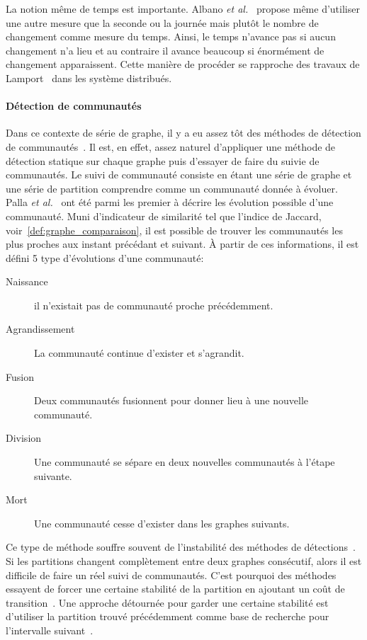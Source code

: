 La notion même de temps est importante.
Albano \emph{et al.}~\cite{Albano2014} propose même d'utiliser une autre mesure que la seconde ou la journée mais plutôt le nombre de changement comme mesure du temps.
Ainsi, le temps n'avance pas si aucun changement n'a lieu et au contraire il avance beaucoup si énormément de changement apparaissent.
Cette manière de procéder se rapproche des travaux de Lamport~\cite{Lamport1978} dans les système distribués.

\paragraph{Détection de communautés}
Dans ce contexte de série de graphe, il y a eu assez tôt des méthodes de détection de communautés~\cite{Hopcroft2004,Sun2007,Lin2008,Asur2009}.
Il est, en effet, assez naturel d'appliquer une méthode de détection statique sur chaque graphe puis d'essayer de faire du suivie de communautés.
Le suivi de communauté consiste en étant une série de graphe et une série de partition comprendre comme un communauté donnée à évoluer.
Palla \emph{et al.}~\cite{Palla2007} ont été parmi les premier à décrire les évolution possible d'une communauté.
Muni d'indicateur de similarité tel que l'indice de Jaccard, voir~\ref{def:graphe_comparaison}, il est possible de trouver les communautés les plus proches aux instant précédant et suivant.
\`A partir de ces informations, il est défini 5 type d'évolutions d'une communauté:
\begin{description}
\item[Naissance] il n'existait pas de communauté proche précédemment.
\item[Agrandissement] La communauté continue d'exister et s'agrandit.
\item[Fusion] Deux communautés fusionnent pour donner lieu à une nouvelle communauté.
\item[Division] Une communauté se sépare en deux nouvelles communautés à l'étape suivante.
\item[Mort] Une communauté cesse d'exister dans les graphes suivants.
\end{description}

Ce type de méthode souffre souvent de l'instabilité des méthodes de détections~\cite{Aynaud2010,Harenberg2014a}.
Si les partitions changent complètement entre deux graphes consécutif, alors il est difficile de faire un réel suivi de communautés.
C'est pourquoi des méthodes essayent de forcer une certaine stabilité de la partition en ajoutant un coût de transition~\cite{Chakrabarti2006,Chen2013,Kalavathi2015}.
Une approche détournée pour garder une certaine stabilité est d'utiliser la partition trouvé précédemment comme base de recherche pour l'intervalle suivant~\cite{Lancichinetti2011a}.

